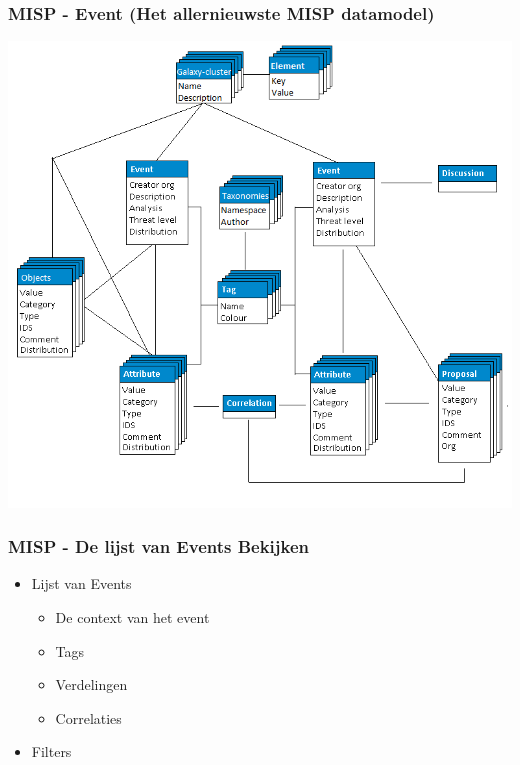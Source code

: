 \begin{frame}
    \frametitle{MISP - Event \newline (Het allernieuwste MISP datamodel)}
    \includegraphics[scale=0.25]{screenshots/datamodel8.png}
\end{frame}

\begin{frame}
    \frametitle{MISP - De lijst van Events Bekijken}
    \begin{itemize}
    \item Lijst van Events
        \begin{itemize}
            \item De context van het event
            \item Tags
            \item Verdelingen
            \item Correlaties
        \end{itemize}
    \item Filters
    \end{itemize}
\end{frame}

